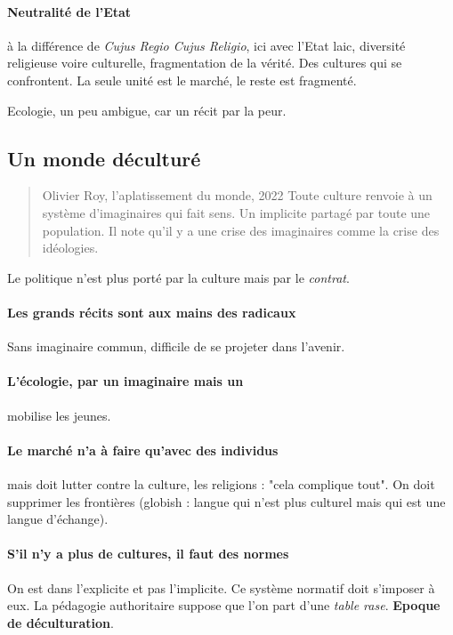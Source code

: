 \paragraph{Neutralité de l'Etat} à la différence de \textit{Cujus Regio Cujus Religio}, ici avec l'Etat laic, diversité religieuse voire culturelle, fragmentation de la vérité. Des cultures qui se confrontent.  La seule unité est le marché, le reste est fragmenté.
\begin{Ex}
    Ecologie, un peu ambigue, car un récit par la peur. 
\end{Ex}

\subsection{Un monde déculturé}

\begin{quote}
    Olivier Roy, l'aplatissement du monde, 2022
    Toute culture renvoie à un système d'imaginaires qui fait sens. Un implicite partagé par toute une population. Il note qu'il y a une crise des imaginaires comme la crise des idéologies. 
\end{quote}
 Le politique n'est plus porté par la culture mais par le \textit{contrat}. 

 \paragraph{Les grands récits sont aux mains des radicaux} Sans imaginaire commun, difficile de se projeter dans l'avenir. 

 \paragraph{L'écologie, par un imaginaire mais un } mobilise les jeunes. 

\paragraph{Le marché n'a à faire qu'avec des individus} mais doit lutter contre la culture, les religions : "cela complique tout". On doit supprimer les frontières (globish : langue qui n'est plus culturel mais qui est une langue d'échange).

\paragraph{S'il n'y a plus de cultures, il faut des normes} On est dans l'explicite et pas l'implicite. Ce système normatif doit s'imposer à eux. La pédagogie authoritaire suppose que l'on part d'une \textit{table rase}. \textbf{Epoque de déculturation}.
 
